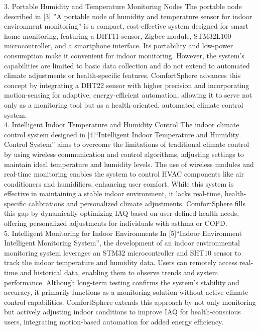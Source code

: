 \documentclass{article}
\begin{document}
3. Portable Humidity and Temperature Monitoring Nodes
The portable node described in [3] ”A portable node of humidity and temperature sensor for indoor environment monitoring” is a compact, cost-effective system designed for smart home monitoring, featuring a DHT11 sensor, Zigbee module, STM32L100 microcontroller, and a smartphone interface. Its portability and low-power consumption make it convenient for indoor monitoring. However, the system’s capabilities are limited to basic data collection and do not extend to automated climate adjustments or health-specific features. ComfortSphere advances this concept by integrating a DHT22 sensor with higher precision and incorporating motion-sensing for adaptive, energy-efficient automation, allowing it to serve not only as a monitoring tool but as a health-oriented, automated climate control system.\\

4. Intelligent Indoor Temperature and Humidity Control
The indoor climate control system designed in [4]“Intelligent Indoor Temperature and Humidity Control System” aims to overcome the limitations of traditional climate control by using wireless communication and control algorithms, adjusting settings to maintain ideal temperature and humidity levels. The use of wireless modules and real-time monitoring enables the system to control HVAC components like air conditioners and humidifiers, enhancing user comfort. While this system is effective in maintaining a stable indoor environment, it lacks real-time, health-specific calibrations and personalized climate adjustments. ComfortSphere fills this gap by dynamically optimizing IAQ based on user-defined health needs, offering personalized adjustments for individuals with asthma or COPD.\\

5. Intelligent Monitoring for Indoor Environments
In [5]“Indoor Environment Intelligent Monitoring System”, the development of an indoor environmental monitoring system leverages an STM32 microcontroller and SHT10 sensor to track the indoor temperature and humidity data. Users can remotely access real-time and historical data, enabling them to observe trends and system performance. Although long-term testing confirms the system’s stability and accuracy, it primarily functions as a monitoring solution without active climate control capabilities. ComfortSphere extends this approach by not only monitoring but actively adjusting indoor conditions to improve IAQ for health-conscious users, integrating motion-based automation for added energy efficiency.\\
\end{document}
